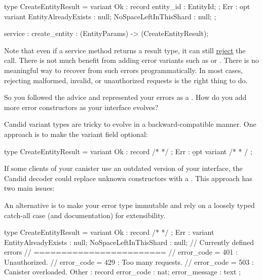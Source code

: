 \documentclass{article}
\begin{document}
\begin{code}[good]
type CreateEntityResult = variant {
  Ok  : record { entity_id : EntityId; };
  Err : opt variant {
    EntityAlreadyExists : null;
    NoSpaceLeftInThisShard : null;
  }
};

service : {
  create_entity : (EntityParams) -> (CreateEntityResult);
}
\end{code}

Note that even if a service method returns a result type, it can still \href{https://internetcomputer.org/docs/current/references/ic-interface-spec/#reject-codes}{reject} the call.
There is not much benefit from adding error variants such as  or .
There is no meaningful way to recover from such errors programmatically.
In most cases, rejecting malformed, invalid, or unauthorized requests is the right thing to do.

So you followed the advice and represented your errors as a .
How do you add more error constructors as your interface evolves?


Candid variant types are tricky to evolve in a backward-compatible manner.
One approach is to make the variant field optional:

\begin{code}[good]
type CreateEntityResult = variant {
  Ok : record { /* */ };
  Err : \b{opt} variant { /* * /}
};
\end{code}

If some clients of your canister use an outdated version of your interface, the Candid decoder could replace unknown constructors with a .
This approach has two main issues:

An alternative is to make your error type immutable and rely on a loosely typed catch-all case (and documentation) for extensibility.

\begin{code}[good]
type CreateEntityResult = variant {
  Ok : record { /* */ };
  Err : variant {
    EntityAlreadyExists : null;
    NoSpaceLeftInThisShard : null;
    // Currently defined errors
    // ========================
    // error_code = 401 : Unauthorized.
    // error_code = 429 : Too many requests.
    // error_code = 503 : Canister overloaded.
    Other : record { error_code : nat; error_message : text }
  }
};
\end{code}
\end{document}

